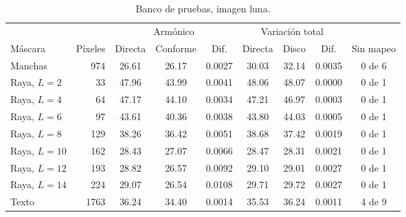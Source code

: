 \begin{table}[ht]
  \centering
  \caption{Banco de pruebas, imagen luna.}
  \label{tab:anexo-luna}
  \small
  \begin{tabular}{@{}lrccccccc@{}}
    \toprule
    & & \multicolumn{3}{c}{Armónico} & \multicolumn{3}{c}{Variación total} & \\
    \cmidrule(lr){3-5}\cmidrule(lr){6-8}
    Máscara & Píxeles & Directa & Conforme & Dif. & Directa & Disco & Dif. & Sin mapeo \\
    \midrule
    Manchas & 974 & 26.61 & 26.17 & 0.0027 & 30.03 & 32.14 & 0.0035 & 0 de 6 \\
    Raya, $L=2$ & 33 & 47.96 & 43.99 & 0.0041 & 48.06 & 48.07 & 0.0000 & 0 de 1 \\
    Raya, $L=4$ & 64 & 47.17 & 44.10 & 0.0034 & 47.21 & 46.97 & 0.0003 & 0 de 1 \\
    Raya, $L=6$ & 97 & 43.61 & 40.36 & 0.0038 & 43.80 & 44.03 & 0.0005 & 0 de 1 \\
    Raya, $L=8$ & 129 & 38.26 & 36.42 & 0.0051 & 38.68 & 37.42 & 0.0019 & 0 de 1 \\
    Raya, $L=10$ & 162 & 28.43 & 27.07 & 0.0066 & 28.47 & 28.31 & 0.0021 & 0 de 1 \\
    Raya, $L=12$ & 193 & 28.82 & 26.57 & 0.0092 & 29.10 & 29.01 & 0.0027 & 0 de 1 \\
    Raya, $L=14$ & 224 & 29.07 & 26.54 & 0.0108 & 29.71 & 29.72 & 0.0027 & 0 de 1 \\
    Texto & 1763 & 36.24 & 34.40 & 0.0014 & 35.53 & 36.24 & 0.0011 & 4 de 9 \\
    \bottomrule
  \end{tabular}
  \propia
\end{table}


